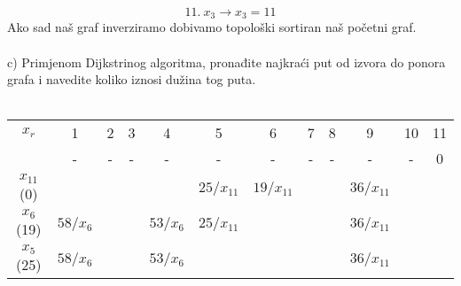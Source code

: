 \documentclass[12pt]{article}
\begin{document}
\begin{enumerate}
\begin{equation*}
\end{equation*}
\begin{equation*}
    11.~x_3 \rightarrow x_3 = 11
\end{equation*}
Ako sad naš graf inverziramo dobivamo topološki sortiran naš početni graf.
\\
\\
c) Primjenom Dijkstrinog algoritma, pronađite najkraći put od izvora do ponora grafa i navedite koliko iznosi dužina tog puta.
\\
\\
\begin{tabular}{|c|c|c|c|c|c|c|c|c|c|c|c|}
\hline
$x_r$         & 1                                 & 2                                 & 3                                 & 4                                 & 5                                  & 6                                  & 7                                 & 8                                 & 9                                  & 10                                & 11                       \\ \cline{2-12} 
              & -                                 & -                                 & -                                 & -                                 & -                                  & -                                  & -                                 & -                                 & -                                  & -                                 & {\color[HTML]{FE0000} 0} \\ \hline
$x_{11}$ (0)  &                                   &                                   &                                   &                                   & $25/x_{11}$                        & {\color[HTML]{FE0000} $19/x_{11}$} &                                   &                                   & $36/x_{11}$                        &                                   &                          \\ \hline
$x_6$ (19)    & $58/x_{6}$                        &                                   &                                   & $53/x_{6}$                        & {\color[HTML]{FE0000} $25/x_{11}$} &                                    &                                   &                                   & $36/x_{11}$                        &                                   &                          \\ \hline
$x_5$ (25)    & $58/x_{6}$                        &                                   &                                   & $53/x_{6}$                        &                                    &                                    &                                   &                                   & {\color[HTML]{FE0000} $36/x_{11}$} &                                   &                          \\ \hline

\end{tabular}
\end{enumerate}
\end{document}
